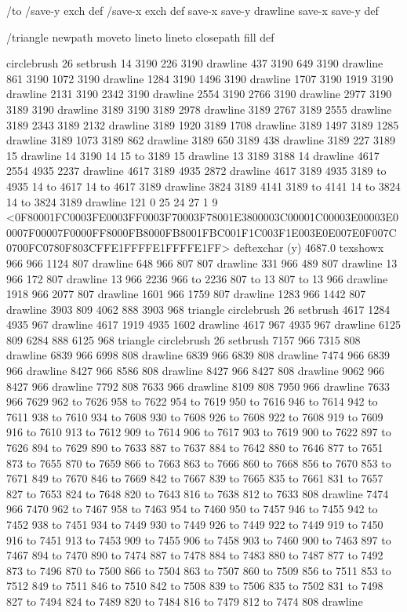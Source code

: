 /to
 { /save-y exch def
   /save-x exch def
   save-x save-y drawline
   save-x save-y } def

/triangle
 { newpath moveto lineto lineto closepath fill } def

circlebrush 26 setbrush
14 3190 226 3190 drawline
437 3190 649 3190 drawline
861 3190 1072 3190 drawline
1284 3190 1496 3190 drawline
1707 3190 1919 3190 drawline
2131 3190 2342 3190 drawline
2554 3190 2766 3190 drawline
2977 3190 3189 3190 drawline
3189 3190 3189 2978 drawline
3189 2767 3189 2555 drawline
3189 2343 3189 2132 drawline
3189 1920 3189 1708 drawline
3189 1497 3189 1285 drawline
3189 1073 3189 862 drawline
3189 650 3189 438 drawline
3189 227 3189 15 drawline
14 3190 14 15 to 3189 15 drawline
13 3189 3188 14 drawline
4617 2554 4935 2237 drawline
4617 3189 4935 2872 drawline
4617 3189 4935 3189 to 4935 14 to 4617 14 to 4617 3189 drawline
3824 3189 4141 3189 to 4141 14 to 3824 14 to 3824 3189 drawline
121 0 25 24 27 1 9 {{<0F80001FC0003FE0003FF0003F70003F78001E3800003C00001C00003E00003E00007F00007F0000FF8000FB8000FB8001FBC001F1C003F1E003E0E007E0F007C0700FC0780F803CFFE1FFFFE1FFFFE1FF>}} deftexchar
(y) 4687.0 texshowx
966 966 1124 807 drawline
648 966 807 807 drawline
331 966 489 807 drawline
13 966 172 807 drawline
13 966 2236 966 to 2236 807 to 13 807 to 13 966 drawline
1918 966 2077 807 drawline
1601 966 1759 807 drawline
1283 966 1442 807 drawline
3903 809 4062 888 3903 968 triangle
circlebrush 26 setbrush
4617 1284 4935 967 drawline
4617 1919 4935 1602 drawline
4617 967 4935 967 drawline
6125 809 6284 888 6125 968 triangle
circlebrush 26 setbrush
7157 966 7315 808 drawline
6839 966 6998 808 drawline
6839 966 6839 808 drawline
7474 966 6839 966 drawline
8427 966 8586 808 drawline
8427 966 8427 808 drawline
9062 966 8427 966 drawline
7792 808 7633 966 drawline
8109 808 7950 966 drawline
7633 966 7629 962 to 7626 958 to 7622 954 to 7619 950 to 7616 946 to 7614 942 to 7611 938 to 7610 934 to 7608 930 to 7608 926 to 7608 922 to 7608 919 to 7609 916 to 7610 913 to 7612 909 to 7614 906 to 7617 903 to 7619 900 to 7622 897 to 7626 894 to 7629 890 to 7633 887 to 7637 884 to 7642 880 to 7646 877 to 7651 873 to 7655 870 to 7659 866 to 7663 863 to 7666 860 to 7668 856 to 7670 853 to 7671 849 to 7670 846 to 7669 842 to 7667 839 to 7665 835 to 7661 831 to 7657 827 to 7653 824 to 7648 820 to 7643 816 to 7638 812 to 7633 808 drawline
7474 966 7470 962 to 7467 958 to 7463 954 to 7460 950 to 7457 946 to 7455 942 to 7452 938 to 7451 934 to 7449 930 to 7449 926 to 7449 922 to 7449 919 to 7450 916 to 7451 913 to 7453 909 to 7455 906 to 7458 903 to 7460 900 to 7463 897 to 7467 894 to 7470 890 to 7474 887 to 7478 884 to 7483 880 to 7487 877 to 7492 873 to 7496 870 to 7500 866 to 7504 863 to 7507 860 to 7509 856 to 7511 853 to 7512 849 to 7511 846 to 7510 842 to 7508 839 to 7506 835 to 7502 831 to 7498 827 to 7494 824 to 7489 820 to 7484 816 to 7479 812 to 7474 808 drawline
